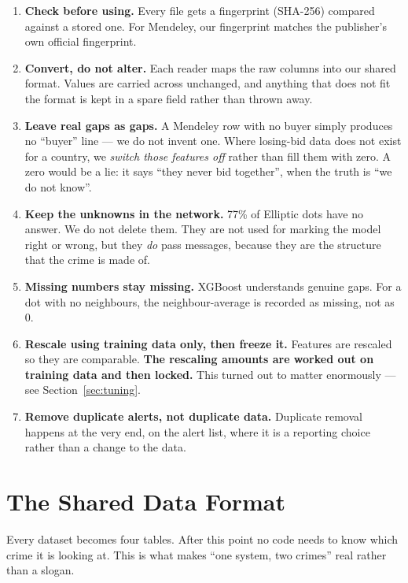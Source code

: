 \documentclass[11pt,a4paper]{article}
\begin{document}
\begin{enumerate}
  \item \textbf{Check before using.} Every file gets a fingerprint (SHA-256)
        compared against a stored one. For Mendeley, our fingerprint matches the
        publisher's own official fingerprint.
  \item \textbf{Convert, do not alter.} Each reader maps the raw columns into our
        shared format. Values are carried across unchanged, and anything that
        does not fit the format is kept in a spare field rather than thrown away.
  \item \textbf{Leave real gaps as gaps.} A Mendeley row with no buyer simply
        produces no ``buyer'' line --- we do not invent one. Where losing-bid data
        does not exist for a country, we \emph{switch those features off} rather
        than fill them with zero. A zero would be a lie: it says ``they never bid
        together'', when the truth is ``we do not know''.
  \item \textbf{Keep the unknowns in the network.} 77\% of Elliptic dots have no
        answer. We do not delete them. They are not used for marking the model
        right or wrong, but they \emph{do} pass messages, because they are the
        structure that the crime is made of.
  \item \textbf{Missing numbers stay missing.} XGBoost understands genuine gaps.
        For a dot with no neighbours, the neighbour-average is recorded as
        missing, not as 0.
  \item \textbf{Rescale using training data only, then freeze it.} Features are
        rescaled so they are comparable. \textbf{The rescaling amounts are worked
        out on training data and then locked.} This turned out to matter enormously
        --- see Section~\ref{sec:tuning}.
  \item \textbf{Remove duplicate alerts, not duplicate data.} Duplicate removal
        happens at the very end, on the alert list, where it is a reporting
        choice rather than a change to the data.
\end{enumerate}

\section{The Shared Data Format}

Every dataset becomes four tables. After this point no code needs to know which
crime it is looking at. This is what makes ``one system, two crimes'' real rather
than a slogan.
\end{document}
